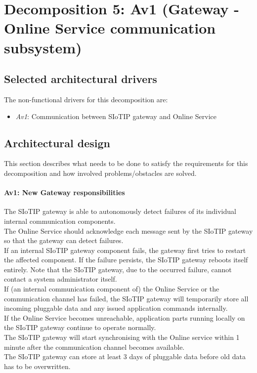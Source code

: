 \section{Decomposition 5: Av1 (Gateway - Online Service communication subsystem)}


\subsection{Selected architectural drivers}
    The non-functional drivers for this decomposition are:
    \begin{itemize}
    	\item \emph{Av1}: Communication between SIoTIP gateway and Online Service
    \end{itemize}


\subsection{Architectural design}
    This section describes what needs to be done to satisfy the requirements for
    this decomposition and how involved problems/obstacles are solved.

    \paragraph{Av1: New Gateway responsibilities}
        The SIoTIP gateway is able to autonomously detect failures of its individual internal communication components.\\
        The Online Service should acknowledge each message sent by the SIoTIP gateway so that the gateway can detect failures.\\
        If an internal SIoTIP gateway component fails, the gateway first tries to restart the affected component.
        If the failure persists, the SIoTIP gateway reboots itself entirely. Note that the SIoTIP gateway,
        due to the occurred failure, cannot contact a system administrator itself.\\
        If (an internal communication component of) the Online Service or the communication
        channel has failed, the SIoTIP gateway will temporarily store all incoming pluggable data
        and any issued application commands internally.\\
        If the Online Service becomes unreachable, application parts running locally on the SIoTIP
        gateway continue to operate normally.\\
        The SIoTIP gateway will start synchronising with the Online service within 1 minute after the
        communication channel becomes available.\\
        The SIoTIP gateway can store at least 3 days of pluggable data before old data has to be overwritten. \\

